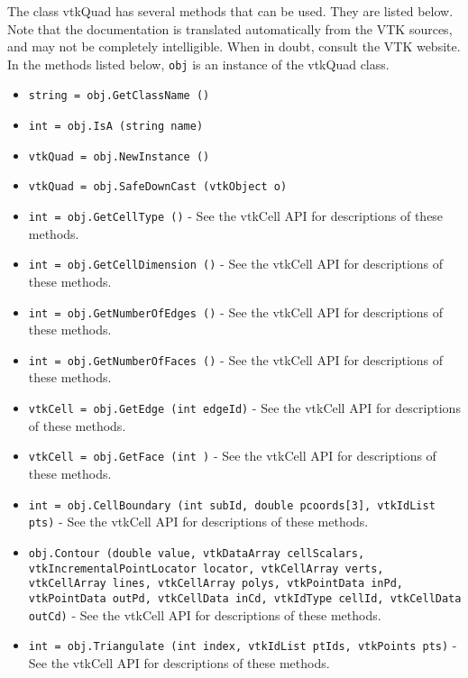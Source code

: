The class vtkQuad has several methods that can be used.
  They are listed below.
Note that the documentation is translated automatically from the VTK sources,
and may not be completely intelligible.  When in doubt, consult the VTK website.
In the methods listed below, \verb|obj| is an instance of the vtkQuad class.
\begin{itemize}
\item  \verb|string = obj.GetClassName ()|

\item  \verb|int = obj.IsA (string name)|

\item  \verb|vtkQuad = obj.NewInstance ()|

\item  \verb|vtkQuad = obj.SafeDownCast (vtkObject o)|

\item  \verb|int = obj.GetCellType ()| -  See the vtkCell API for descriptions of these methods.

\item  \verb|int = obj.GetCellDimension ()| -  See the vtkCell API for descriptions of these methods.

\item  \verb|int = obj.GetNumberOfEdges ()| -  See the vtkCell API for descriptions of these methods.

\item  \verb|int = obj.GetNumberOfFaces ()| -  See the vtkCell API for descriptions of these methods.

\item  \verb|vtkCell = obj.GetEdge (int edgeId)| -  See the vtkCell API for descriptions of these methods.

\item  \verb|vtkCell = obj.GetFace (int )| -  See the vtkCell API for descriptions of these methods.

\item  \verb|int = obj.CellBoundary (int subId, double pcoords[3], vtkIdList pts)| -  See the vtkCell API for descriptions of these methods.

\item  \verb|obj.Contour (double value, vtkDataArray cellScalars, vtkIncrementalPointLocator locator, vtkCellArray verts, vtkCellArray lines, vtkCellArray polys, vtkPointData inPd, vtkPointData outPd, vtkCellData inCd, vtkIdType cellId, vtkCellData outCd)| -  See the vtkCell API for descriptions of these methods.

\item  \verb|int = obj.Triangulate (int index, vtkIdList ptIds, vtkPoints pts)| -  See the vtkCell API for descriptions of these methods.


\end{itemize}
